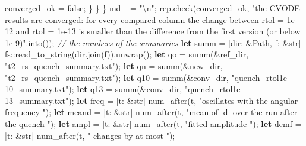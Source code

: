 \documentclass[
  10pt,
]{article}
\newenvironment{Shaded}{}{}
\newcommand{\CommentTok}[1]{\textcolor[rgb]{0.38,0.63,0.69}{\textit{#1}}}
\newcommand{\ConstantTok}[1]{\textcolor[rgb]{0.53,0.00,0.00}{#1}}
\newcommand{\DataTypeTok}[1]{\textcolor[rgb]{0.56,0.13,0.00}{#1}}
\newcommand{\KeywordTok}[1]{\textcolor[rgb]{0.00,0.44,0.13}{\textbf{#1}}}
\newcommand{\NormalTok}[1]{#1}
\newcommand{\OperatorTok}[1]{\textcolor[rgb]{0.40,0.40,0.40}{#1}}
\newcommand{\PreprocessorTok}[1]{\textcolor[rgb]{0.74,0.48,0.00}{#1}}
\newcommand{\SpecialCharTok}[1]{\textcolor[rgb]{0.25,0.44,0.63}{#1}}
\newcommand{\StringTok}[1]{\textcolor[rgb]{0.25,0.44,0.63}{#1}}
\begin{document}
\begin{Shaded}
\begin{Highlighting}[]
\NormalTok{                converged\_ok }\OperatorTok{=} \ConstantTok{false}\OperatorTok{;}
            \OperatorTok{\}}
        \OperatorTok{\}}
    \OperatorTok{\}}
\NormalTok{    md }\OperatorTok{+=} \StringTok{"}\SpecialCharTok{\textbackslash{}n}\StringTok{"}\OperatorTok{;}
\NormalTok{    rep}\OperatorTok{.}\NormalTok{check(converged\_ok}\OperatorTok{,} \StringTok{"the CVODE results are converged: for every compared column the change between rtol = 1e{-}12 and rtol = 1e{-}13 is smaller than the difference from the first version (or below 1e{-}9)"}\OperatorTok{.}\NormalTok{into())}\OperatorTok{;}
    \CommentTok{// the numbers of the summaries}
    \KeywordTok{let}\NormalTok{ summ }\OperatorTok{=} \OperatorTok{|}\NormalTok{dir}\OperatorTok{:} \OperatorTok{\&}\DataTypeTok{Path}\OperatorTok{,}\NormalTok{ f}\OperatorTok{:} \OperatorTok{\&}\DataTypeTok{str}\OperatorTok{|} \PreprocessorTok{fs::}\NormalTok{read\_to\_string(dir}\OperatorTok{.}\NormalTok{join(f))}\OperatorTok{.}\NormalTok{unwrap()}\OperatorTok{;}
    \KeywordTok{let}\NormalTok{ qo }\OperatorTok{=}\NormalTok{ summ(}\OperatorTok{\&}\NormalTok{ref\_dir}\OperatorTok{,} \StringTok{"t2\_rs\_quench\_summary.txt"}\NormalTok{)}\OperatorTok{;}
    \KeywordTok{let}\NormalTok{ qn }\OperatorTok{=}\NormalTok{ summ(}\OperatorTok{\&}\NormalTok{new\_dir}\OperatorTok{,} \StringTok{"t2\_rs\_quench\_summary.txt"}\NormalTok{)}\OperatorTok{;}
    \KeywordTok{let}\NormalTok{ q10 }\OperatorTok{=}\NormalTok{ summ(}\OperatorTok{\&}\NormalTok{conv\_dir}\OperatorTok{,} \StringTok{"quench\_rtol1e{-}10\_summary.txt"}\NormalTok{)}\OperatorTok{;}
    \KeywordTok{let}\NormalTok{ q13 }\OperatorTok{=}\NormalTok{ summ(}\OperatorTok{\&}\NormalTok{conv\_dir}\OperatorTok{,} \StringTok{"quench\_rtol1e{-}13\_summary.txt"}\NormalTok{)}\OperatorTok{;}
    \KeywordTok{let}\NormalTok{ freq }\OperatorTok{=} \OperatorTok{|}\NormalTok{t}\OperatorTok{:} \OperatorTok{\&}\DataTypeTok{str}\OperatorTok{|}\NormalTok{ num\_after(t}\OperatorTok{,} \StringTok{"oscillates with the angular frequency "}\NormalTok{)}\OperatorTok{;}
    \KeywordTok{let}\NormalTok{ meand }\OperatorTok{=} \OperatorTok{|}\NormalTok{t}\OperatorTok{:} \OperatorTok{\&}\DataTypeTok{str}\OperatorTok{|}\NormalTok{ num\_after(t}\OperatorTok{,} \StringTok{"mean of |d| over the run after the quench "}\NormalTok{)}\OperatorTok{;}
    \KeywordTok{let}\NormalTok{ ampl }\OperatorTok{=} \OperatorTok{|}\NormalTok{t}\OperatorTok{:} \OperatorTok{\&}\DataTypeTok{str}\OperatorTok{|}\NormalTok{ num\_after(t}\OperatorTok{,} \StringTok{"fitted amplitude "}\NormalTok{)}\OperatorTok{;}
    \KeywordTok{let}\NormalTok{ demf }\OperatorTok{=} \OperatorTok{|}\NormalTok{t}\OperatorTok{:} \OperatorTok{\&}\DataTypeTok{str}\OperatorTok{|}\NormalTok{ num\_after(t}\OperatorTok{,} \StringTok{" changes by at most "}\NormalTok{)}\OperatorTok{;}

\end{Highlighting}
\end{Shaded}
\end{document}
